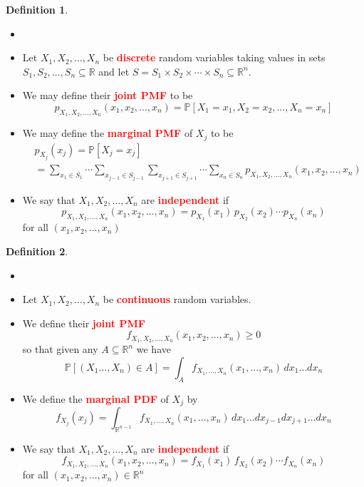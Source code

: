 \documentclass{article}
\newcommand{\PP}{\mathbb{P}}
\newcommand{\R}{\mathbb{R}}
\newcommand{\bfred}[1]{\textcolor{red}{\textbf{#1}}}
\theoremstyle{plain}
\theoremstyle{definition}
\newtheorem{defn}{Definition}[section]
\theoremstyle{remark}
\begin{document}
\begin{defn}
    \begin{itemize}
        \item []
        \item Let $X_1,X_2,\dotsc,X_n$ be \bfred{discrete} random variables taking values in sets $S_1,S_2,\dotsc,S_n\subseteq\R$ and let $S=S_1 \times S_2 \times \dotsm \times S_n \subseteq\R^n$.
        \item We may define their \bfred{joint PMF} to be \[p_{X_1,X_2,\dotsc,X_n}(x_1,x_2,\dotsc,x_n)=\PP[X_1=x_1,X_2=x_2,\dotsc,X_n=x_n]\]
        \item We may define the \bfred{marginal PMF} of $X_j$ to be
        \begin{align*}
            &p_{X_j}(x_j)=\PP[X_j=x_j] \\
            &= \sum_{x_1\in S_1} \dotsm \sum_{x_{j-1}\in S_{j-1}} \sum_{x_{j+1}\in S_{j+1}} \dotsm \sum_{x_n\in S_n} p_{X_1,X_2,\dotsc,X_n}(x_1,x_2,\dotsc,x_n)
        \end{align*}
        \item We say that $X_1,X_2,\dotsc,X_n$ are \bfred{independent} if \[p_{X_1,X_2,\dotsc,X_n}(x_1,x_2,\dotsc,x_n)=p_{X_1}(x_1)\,p_{X_2}(x_2)\dotsm p_{X_n}(x_n)\] for all $(x_1,x_2,\dotsc,x_n)$
    \end{itemize}
\end{defn}

\begin{defn}
    \begin{itemize}
        \item []
        \item Let $X_1,X_2,\dotsc,X_n$ be \bfred{continuous} random variables.
        \item We define their \bfred{joint PMF} \[f_{X_1,X_2,\dotsc,X_n}(x_1,x_2,\dotsc,x_n) \geq 0\] so that given any $A\subseteq\R^n$ we have \[\PP[(X_1\dotsc,X_n)\in A] = \int_{A}f_{X_1,\dotsc,X_n}(x_1,\dotsc,x_n)\,dx_1\dotsc dx_n\]
        \item We define the \bfred{marginal PDF} of $X_j$ by \[f_{X_j}(x_j) = \int_{\R^{n-1}}f_{X_1,\dotsc,X_n}(x_1,\dotsc,x_n)\,dx_1\dotsc dx_{j-1}dx_{j+1}\dotsc dx_n\]
        \item We say that $X_1,X_2,\dotsc,X_n$ are \bfred{independent} if \[f_{X_1,X_2,\dotsc,X_n}(x_1,x_2,\dotsc,x_n) = f_{X_1}(x_1)\,f_{X_2}(x_2)\dotsm f_{X_n}(x_n)\] for all $(x_1, x_2, \dotsc, x_n) \in \R^n$
    \end{itemize}
\end{defn}
\end{document}
